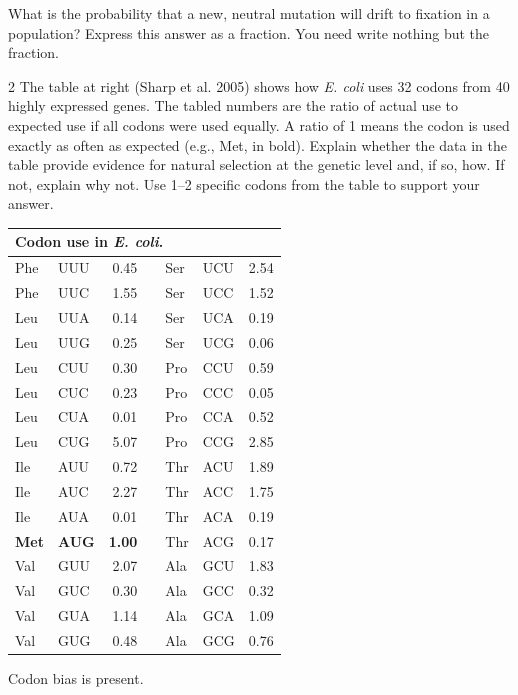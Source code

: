 
\question[3]
What is the probability that a new, neutral mutation will drift to fixation in a population?  Express this answer as a fraction.  You need write nothing but the fraction.




\question[15]

\begin{multicols}{2}
\flushleft
The table at right (Sharp et al. 2005) shows how \textit{E. coli} uses 32 codons from 40 highly expressed genes. The tabled numbers are the ratio of actual use to expected use if all codons were used equally. A ratio of 1 means the codon is used exactly as often as expected (e.g., Met, in bold). Explain whether the data in the table provide evidence for natural selection at the genetic level and, if so, how. If not, explain why not. Use 1--2 specific codons from the table to support your answer.
\columnbreak
\begin{tabular}{@{}llrcllr@{}}
	\toprule
	\multicolumn{7}{l}{Codon use in \textit{E. coli}.}\\
	\midrule
	Phe & UUU & 0.45 &  & Ser & UCU & 2.54\\
Phe & UUC & 1.55 &  & Ser & UCC & 1.52\\
Leu & UUA & 0.14 &  & Ser & UCA & 0.19\\
Leu & UUG & 0.25 &  & Ser & UCG & 0.06\\
Leu & CUU & 0.30 &  & Pro & CCU & 0.59\\
Leu & CUC & 0.23 &  & Pro & CCC & 0.05\\
Leu & CUA & 0.01 &  & Pro & CCA & 0.52\\
Leu & CUG & 5.07 &  & Pro & CCG & 2.85\\
Ile & AUU & 0.72 &  & Thr & ACU & 1.89\\
Ile & AUC & 2.27 &  & Thr & ACC & 1.75\\
Ile & AUA & 0.01 &  & Thr & ACA & 0.19\\
\textbf{Met} & \textbf{AUG} & \textbf{1.00} &  & Thr & ACG & 0.17\\
Val & GUU & 2.07 &  & Ala & GCU & 1.83\\
Val & GUC & 0.30 &  & Ala & GCC & 0.32\\
Val & GUA & 1.14 &  & Ala & GCA & 1.09\\
Val & GUG & 0.48 &  & Ala & GCG & 0.76\\
	\bottomrule
	\end{tabular}
\end{multicols}
	\begin{solution}
	Codon bias is present.
	\end{solution}

